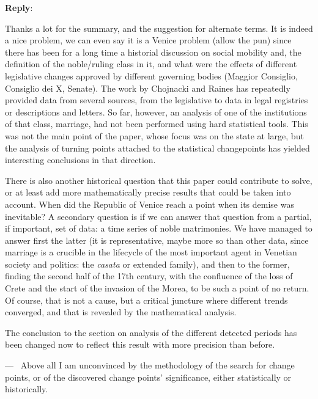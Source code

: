 \documentclass[11pt]{article}
\newcounter{reviewer}
\newcounter{point}[reviewer]
\renewcommand{\thepoint}{P\,\thereviewer.\arabic{point}}
\newenvironment{point}
   {\refstepcounter{point} \bigskip \noindent {\textbf{Reviewer~Point~\thepoint} } ---\ }
   {\par }
\newenvironment{reply}
   {\medskip \noindent \begin{sf}\textbf{Reply}:\  }
   {\medskip \end{sf}}
\begin{document}
\begin{reply}

  Thanks a lot for the summary, and the suggestion for alternate terms. It is
  indeed a nice problem, we can even say it is a Venice problem (allow the pun)
  since there has been for a long time a historial discussion on social mobility
  and, the definition of the noble/ruling class in it, and what were the effects
  of different legislative changes approved by different governing bodies
  (Maggior Consiglio, Consiglio dei X, Senate). The work by Chojnacki
  \cite{10.2307/202860,second:serrata,chojnacki00} and Raines
  \cite{raines2013rameau,raines2003cooptazione} has repeatedly provided data
  from several sources, from the legislative to data in legal registries or
  descriptions and letters. So far, however, an analysis of one of the
  institutions of that class, marriage, had not been performed using hard
  statistical tools. This was not the main point of the paper, whose focus was
  on the state at large, but the analysis of turning points attached to the
  statistical changepoints has yielded interesting conclusions in that
  direction.

  There is also another historical question that this paper could contribute to
  solve, or at least add more mathematically precise results that could be taken
  into account. When did the Republic of Venice reach a point when its demise
  was inevitable? A secondary question is if we can answer that question from a
  partial, if important, set of data: a time series of noble matrimonies. We
  have managed to answer first the latter (it is representative, maybe more so
  than other data, since marriage is a crucible in the lifecycle of the most
  important agent in Venetian society and politics: the {\em casata} or extended
  family), and then to the former, finding the second half of the 17th century,
  with the confluence of the loss of Crete and the start of the invasion of the
  Morea, to be such a point of no return. Of course, that is not a cause, but a
  critical juncture where different trends converged, and that is revealed by
  the mathematical analysis.

  The conclusion to the section on analysis of the different detected periods
  has been changed now to reflect this result with more precision than before.
\end{reply}


\begin{point}
Above all I am unconvinced by the methodology of the search for change
points, or of the discovered change points’ significance, either statistically
or historically.
\end{point}
\end{document}
